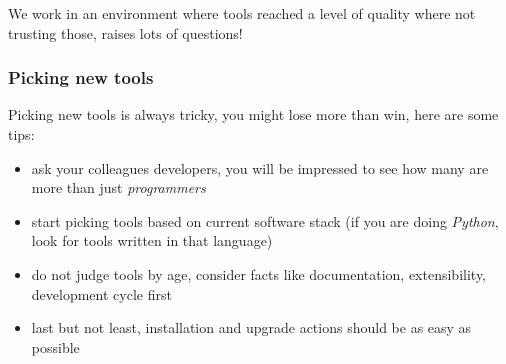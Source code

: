 \documentclass[compress]{beamer}
\begin{document}
\begin{frame}
  \begin{center}
    \huge We work in an environment where tools reached a level of quality where
    not trusting those, raises lots of questions!
  \end{center}
\end{frame}

\begin{frame}
\frametitle{Picking new tools}

Picking new tools is always tricky, you might lose more than win, here are some tips:
\begin{itemize}[<+->]
  \item ask your colleagues developers, you will be impressed to see how many are more than just \emph{programmers}
  \item start picking tools based on current software stack (if you are doing \emph{Python}, look for tools written in that language)
  \item do not judge tools by age, consider facts like documentation, extensibility, development cycle first
  \item last but not least, installation and upgrade actions should be as easy as possible
\end{itemize}
\end{frame}
\end{document}
